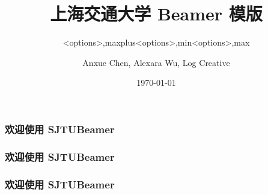 \documentclass[
    aspectratio=169
]{ctexbeamer}
\begin{document}
    \title[SJTU Beamer Template] %
    {\textbf{上海交通大学 Beamer 模版}} %

    \author[Anxue Chen, Alexara Wu, Log Creative]
    {Anxue Chen, Alexara Wu, Log Creative}


    \date{\today}

    \subtitle{<options>,maxplus}
    \logo{\resizebox{!}{0.7cm}{\cnlogo}}
    \maketitle[maxplus]
    \begin{frame}
        \frametitle{欢迎使用 SJTUBeamer}
    \end{frame}
    \makebottom[maxplus]

    \subtitle{<options>,min}
    \logo{\resizebox{!}{0.7cm}{\enlogo}}
    \maketitle[min]
    \begin{frame}
        \frametitle{欢迎使用 SJTUBeamer}
    \end{frame}
    \makebottom[min]

    \subtitle{<options>,max}
    \logo{\resizebox{!}{1cm}{\sjtubadge}}
    \titlegraphic{\sjtubg[opacity=0.2]}
    \maketitle[max]
    \begin{frame}
        \frametitle{欢迎使用 SJTUBeamer}
    \end{frame}
    \makebottom[max]
\end{document}
